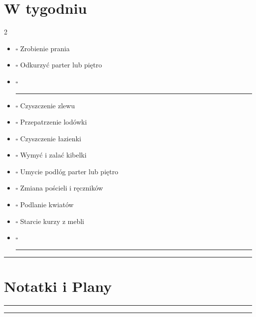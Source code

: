 \documentclass[a4paper, 12pt]{article} %
\newcommand{\midweekboxes}{%
    \leavevmode\unskip\nobreak%
    {\Large$\square$}%
    \hspace{1mm}{\Large$\square$}%
    \hspace{1mm}{\Large$\square$}%
    \hspace{1ex}
}
\newcommand{\weeklybox}{%
    \leavevmode\unskip\nobreak%
    {\Large$\square$}%
    \hspace{1ex}
}
\begin{document}
\section*{W tygodniu}
\begin{multicols}{2}

\begin{itemize}
    \item \midweekboxes Zrobienie prania
    \item \midweekboxes Odkurzyć parter lub piętro
    \item \midweekboxes \rule[0pt]{5cm}{0.5pt}
    \item \weeklybox Czyszczenie zlewu
    \item \weeklybox Przepatrzenie lodówki
    \item \weeklybox Czyszczenie łazienki
    \item \weeklybox Wymyć i zalać kibelki
    \item \weeklybox Umycie podłóg parter lub piętro    
    \item \weeklybox Zmiana pościeli i ręczników
    \item \weeklybox Podlanie kwiatów
    \item \weeklybox Starcie kurzy z mebli
    \item \weeklybox \rule[0pt]{5cm}{0.5pt}
\end{itemize}

\hrule

\vspace{2em} %

\section*{Notatki i Plany}
\hrule
\vspace{5.0cm} %
\hrule


\end{multicols}

\newpage
\end{document}
